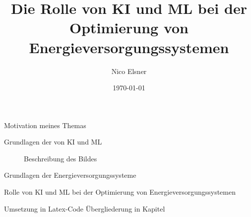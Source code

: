 \documentclass{beamer}
\title{Die Rolle von KI und ML bei der Optimierung von Energieversorgungssystemen}
\author{Nico Elsner}
\date{\today}
\begin{document}
    
\begin{frame}
\titlepage
\end{frame}

\begin{frame}{Motivation meines Themas}
\end{frame}

\begin{frame}{Grundlagen der von KI und ML}

    \begin{figure}
        \centering
        \caption{Beschreibung des Bildes}
        \label{fig:example}
    \end{figure}

\end{frame}


\begin{frame}{Grundlagen der Energieversorgungssysteme}
\end{frame}

\begin{frame}{Rolle von KI und ML bei der Optimierung von Energieversorgungssystemen}
\end{frame}

\begin{frame}{Umsetzung in Latex-Code}
Übergliederung in Kapitel
\end{frame}
\end{document}
